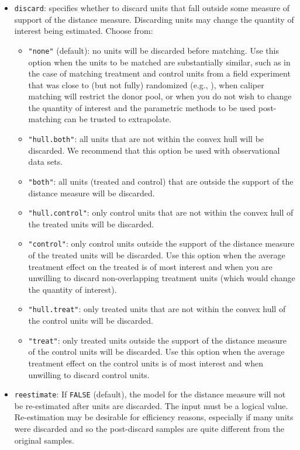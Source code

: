 \begin{itemize}
\item \texttt{discard}: specifies whether to discard units that fall
  outside some measure of support of the distance measure.  Discarding
  units may change the quantity of interest being estimated.  Choose
  from:
  \begin{itemize}
  \item \texttt{"none"} (default): no units will be discarded before
    matching.  Use this option when the units to be matched are
    substantially similar, such as in the case of matching treatment
    and control units from a field experiment that was close to (but
    not fully) randomized (e.g., \citealt{Imai05}), when caliper
    matching will restrict the donor pool, or when you do not wish to
    change the quantity of interest and the parametric methods to be
    used post-matching can be trusted to extrapolate.
  \item \texttt{"hull.both"}: all units that are not within the convex
    hull will be discarded.  We recommend that this option be used
    with observational data sets.
  \item \texttt{"both"}: all units (treated and control) that are
    outside the support of the distance measure will be discarded.
  \item \texttt{"hull.control"}: only control units that are not
    within the convex hull of the treated units will be discarded.  
  \item \texttt{"control"}: only control units outside the support of
    the distance measure of the treated units will be discarded.  Use
    this option when the average treatment effect on the treated is of
    most interest and when you are unwilling to discard
    non-overlapping treatment units (which would change the quantity
    of interest).
  \item \texttt{"hull.treat"}: only treated units that are not within
    the convex hull of the control units will be discarded. 
  \item \texttt{"treat"}: only treated units outside the support of
    the distance measure of the control units will be discarded.  Use
    this option when the average treatment effect on the control units
    is of most interest and when unwilling to discard control units.
  \end{itemize}
  
\item \texttt{reestimate}: If {\tt FALSE} (default), the model for the
  distance measure will not be re-estimated after units are discarded.
  The input must be a logical value.  Re-estimation may be desirable
  for efficiency reasons, especially if many units were discarded and
  so the post-discard samples are quite different from the original
  samples.
  
\end{itemize}

